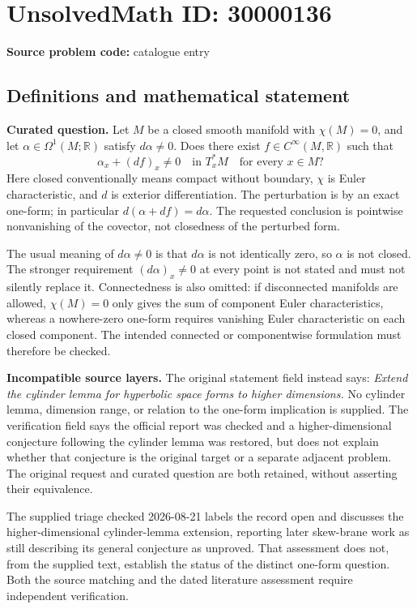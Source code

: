 \documentclass[11pt]{article}
\newcommand{\R}{\mathbb{R}}
\begin{document}
\section*{UnsolvedMath ID: 30000136}
\textbf{Source problem code:} catalogue entry
\subsection{Definitions and mathematical statement}
\textbf{Curated question.} Let \(M\) be a closed smooth manifold with \(\chi(M)=0\), and let \(\alpha\in\Omega^1(M;\R)\) satisfy \(d\alpha\ne0\). Does there exist \(f\in C^\infty(M,\R)\) such that\[\alpha_x+(df)_x\ne0\quad\text{in }T_x^*M\quad\text{for every }x\in M?\] Here closed conventionally means compact without boundary, \(\chi\) is Euler characteristic, and \(d\) is exterior differentiation. The perturbation is by an exact one-form; in particular \(d(\alpha+df)=d\alpha\). The requested conclusion is pointwise nonvanishing of the covector, not closedness of the perturbed form.\par The usual meaning of \(d\alpha\ne0\) is that \(d\alpha\) is not identically zero, so \(\alpha\) is not closed. The stronger requirement \((d\alpha)_x\ne0\) at every point is not stated and must not silently replace it. Connectedness is also omitted: if disconnected manifolds are allowed, \(\chi(M)=0\) only gives the sum of component Euler characteristics, whereas a nowhere-zero one-form requires vanishing Euler characteristic on each closed component. The intended connected or componentwise formulation must therefore be checked.\par \textbf{Incompatible source layers.} The original statement field instead says: \emph{Extend the cylinder lemma for hyperbolic space forms to higher dimensions.} No cylinder lemma, dimension range, or relation to the one-form implication is supplied. The verification field says the official report was checked and a higher-dimensional conjecture following the cylinder lemma was restored, but does not explain whether that conjecture is the original target or a separate adjacent problem. The original request and curated question are both retained, without asserting their equivalence.\par The supplied triage checked 2026-08-21 labels the record open and discusses the higher-dimensional cylinder-lemma extension, reporting later skew-brane work as still describing its general conjecture as unproved. That assessment does not, from the supplied text, establish the status of the distinct one-form question. Both the source matching and the dated literature assessment require independent verification.
\end{document}
